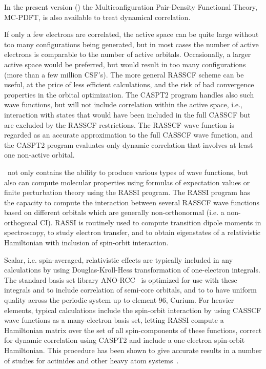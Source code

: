 In the present version (\molcasversion) the Multiconfiguration Pair-Density Functional Theory, MC-PDFT, 
is also available to treat dynamical correlation.

If only a few electrons are correlated, the active space can be quite large
without too many configurations being generated, but in most cases the number of
active electrons is comparable to the number of active orbitals.
Occasionally, a larger active space would be preferred, but would result in too
many configurations (more than a few million CSF's). The more general RASSCF
scheme can be useful, at the price of less efficient calculations, and the risk
of bad convergence properties in the orbital optimization. The CASPT2 program 
handles also such wave functions, but will not include correlation within the
active space, i.e., interaction with states that would have been included in
the full CASSCF but are excluded by the RASSCF restrictions. The RASSCF wave
function is regarded as an accurate approximation to the full CASSCF
wave function, and the CASPT2 program evaluates only dynamic correlation that
involves at least one non-active orbital.

\molcas\ not only contains the ability to produce various types of wave functions, 
but also can compute molecular properties using formulas of expectation values or finite 
perturbation theory using the RASSI program.  
The RASSI program has the capacity to compute the interaction between several 
RASSCF wave functions based on different orbitals which are generally non-orthonormal 
(i.e. a non-orthogonal CI).  RASSI is routinely used to compute transition dipole 
moments in spectroscopy, to study electron transfer, and to obtain eigenstates
of a relativistic Hamiltonian with inclusion of spin-orbit interaction.

Scalar, i.e. spin-averaged, relativistic effects are typically included
in any calculations by using Douglas-Kroll-Hess transformation of one-electron 
integrals. The standard basis set library 
ANO-RCC~\cite{Roos:03c,Roos:03g,Roos:05a,Roos:05b,Roos:08b}
is optimized for use with these integrals and to include correlation of
semi-core orbitals, and to to have uniform quality across the periodic system
up to element 96, Curium. For heavier elements, typical calculations include
the spin-orbit interaction by using CASSCF wave functions as a many-electron basis
set, letting RASSI compute a Hamiltonian matrix over the set of all spin-components
of these functions, correct for dynamic correlation using CASPT2 and include
a one-electron spin-orbit Hamiltonian. This procedure has been shown to give
accurate results in a number of studies for actinides and other 
heavy atom systems~\cite{Roos:03a}. 

